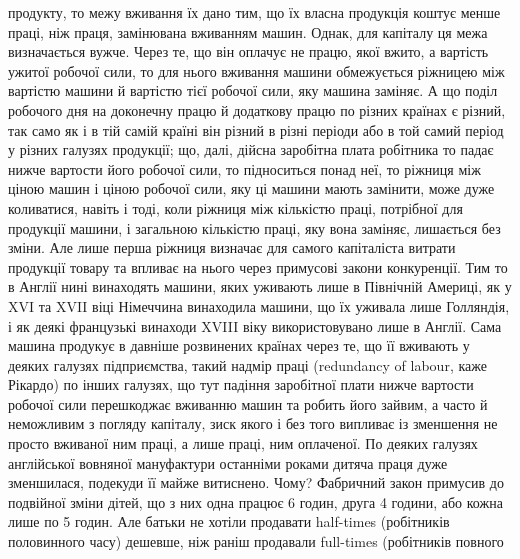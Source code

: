 \parcont{}  %
продукту, то межу вживання їх дано тим, що їх власна продукція
коштує менше праці, ніж праця, замінювана вживанням машин.
Однак, для капіталу ця межа визначається вужче. Через те, що
він оплачує не працю, якої вжито, а вартість ужитої робочої
сили, то для нього вживання машини обмежується ріжницею
між вартістю машини й вартістю тієї робочої сили, яку машина
заміняє. А що поділ робочого дня на доконечну працю й додаткову
працю по різних країнах є різний, так само як і в тій самій
країні він різний в різні періоди або в той самий період у різних
галузях продукції; що, далі, дійсна заробітна плата робітника
то падає нижче вартости його робочої сили, то підноситься понад
неї, то ріжниця між ціною машин і ціною робочої сили, яку ці
машини мають замінити, може дуже коливатися, навіть і тоді,
коли ріжниця між кількістю праці, потрібної для продукції
машини, і загальною кількістю праці, яку вона заміняє, лишається
без зміни.  Але лише перша ріжниця визначає для самого
капіталіста витрати продукції товару та впливає на нього через
примусові закони конкуренції. Тим то в Англії нині винаходять
машини, яких уживають лише в Північній Америці, як у XVI
та XVII віці Німеччина винаходила машини, що їх уживала
лише Голляндія, і як деякі французькі винаходи XVIII віку
використовувано лише в Англії. Сама машина продукує в давніше
розвинених країнах через те, що її вживають у деяких галузях
підприємства, такий надмір праці (redundancy of labour, каже
Рікардо) по інших галузях, що тут падіння заробітної плати нижче
вартости робочої сили перешкоджає вживанню машин та робить
його зайвим, а часто й неможливим з погляду капіталу, зиск
якого і без того випливає із зменшення не просто вживаної ним
праці, а лише праці, ним оплаченої. По деяких галузях англійської
вовняної мануфактури останніми роками дитяча праця дуже
зменшилася, подекуди її майже витиснено. Чому? Фабричний
закон примусив до подвійної зміни дітей, що з них одна працює
6 годин, друга 4 години, або кожна лише по 5 годин. Але батьки
не хотіли продавати half-times (робітників половинного часу)
дешевше, ніж раніш продавали full-times (робітників повного
